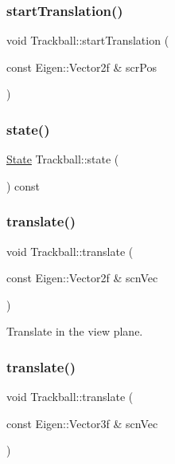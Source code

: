 \subsubsection{\texorpdfstring{start\+Translation()}{startTranslation()}}
{\footnotesize\ttfamily void Trackball\+::start\+Translation (\begin{DoxyParamCaption}\item[{const Eigen\+::\+Vector2f \&}]{scr\+Pos }\end{DoxyParamCaption})}

\mbox{\label{class_trackball_af8dc66630b00cd3d92b999630691ff05}} 
\subsubsection{\texorpdfstring{state()}{state()}}
{\footnotesize\ttfamily \hyperlink{class_trackball_a102216413a87cb37801044063a1b05be}{State} Trackball\+::state (\begin{DoxyParamCaption}{ }\end{DoxyParamCaption}) const}

\mbox{\label{class_trackball_aa4f8422c14007f8b27a3b469abe7b1e2}} 
\subsubsection{\texorpdfstring{translate()}{translate()}\hspace{0.1cm}{\footnotesize\ttfamily [1/2]}}
{\footnotesize\ttfamily void Trackball\+::translate (\begin{DoxyParamCaption}\item[{const Eigen\+::\+Vector2f \&}]{scn\+Vec }\end{DoxyParamCaption})}



Translate in the view plane. 

\mbox{\label{class_trackball_a1a40442f993381ffcba90edacb1d1957}} 
\subsubsection{\texorpdfstring{translate()}{translate()}\hspace{0.1cm}{\footnotesize\ttfamily [2/2]}}
{\footnotesize\ttfamily void Trackball\+::translate (\begin{DoxyParamCaption}\item[{const Eigen\+::\+Vector3f \&}]{scn\+Vec }\end{DoxyParamCaption})}


